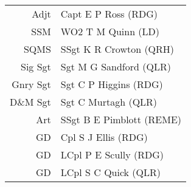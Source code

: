 \begin{center}
  \begin{tabular}{rl}
    Adjt & Capt E P Ross (RDG) \\
    SSM & WO2 T M Quinn (LD) \\
    SQMS & SSgt K R Crowton (QRH) \\
    Sig Sgt & Sgt M G Sandford (QLR) \\
    Gnry Sgt & Sgt C P Higgins (RDG) \\
     D\&M Sgt & Sgt C Murtagh (QLR) \\
    Art & SSgt B E Pimblott (REME) \\
    GD & Cpl S J Ellis (RDG) \\
    GD & LCpl P E Scully (RDG) \\
    GD & LCpl S C Quick (QLR) \\
  \end{tabular}
\end{center}
